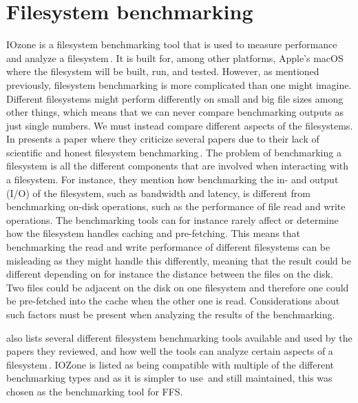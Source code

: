 \section{Filesystem benchmarking}
\label{sec:iozone}
IOzone is a filesystem benchmarking tool that is used to measure performance and analyze a filesystem\,\cite{IozoneFilesystemBenchmark}. It is built for, among other platforms, Apple's macOS where the filesystem will be built, run, and tested. However, as mentioned previously, filesystem benchmarking is more complicated than one might imagine. Different filesystems might perform differently on small and big file sizes among other things, which means that we can never compare benchmarking outputs as just single numbers. We must instead compare different aspects of the filesystems. In \citeyear{tarasovBenchmarkingFileSystem2011} \citeauthor{tarasovBenchmarkingFileSystem2011} presents a paper where they criticize several papers due to their lack of scientific and honest filesystem benchmarking\,\cite{tarasovBenchmarkingFileSystem2011}. The problem of benchmarking a filesystem is all the different components that are involved when interacting with a filesystem. For instance, they mention how benchmarking the in- and output (I/O) of the filesystem, such as bandwidth and latency, is different from benchmarking on-disk operations, such as the performance of file read and write operations. The benchmarking tools can for instance rarely affect or determine how the filesystem handles caching and pre-fetching. This means that benchmarking the read and write performance of different filesystems can be misleading as they might handle this differently, meaning that the result could be different depending on for instance the distance between the files on the disk. Two files could be adjacent on the disk on one filesystem and therefore one could be pre-fetched into the cache when the other one is read. Considerations about such factors must be present when analyzing the results of the benchmarking.

\citeauthor{tarasovBenchmarkingFileSystem2011} also lists several different filesystem benchmarking tools available and used by the papers they reviewed, and how well the tools can analyze certain aspects of a filesystem\,\cite{tarasovBenchmarkingFileSystem2011}. IOZone is listed as being compatible with multiple of the different benchmarking types and as it is simpler to use\,\cite{agarwalComparingIOBenchmarks2018} and still maintained, this was chosen as the benchmarking tool for FFS.